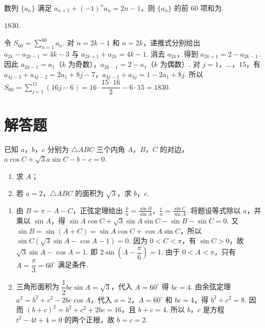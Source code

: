 \begin{problem}
数列 \(\{a_{n}\}\) 满足 \(a_{n + 1} + (-1)^n a_n = 2n - 1\)，则 \(\{a_n\}\) 的前 \(60\) 项和为\fillinblank{}.
\end{problem}

\begin{answer}
\(1830\).
\end{answer}

\begin{solution}
令 \(S_{60}=\sum_{n=1}^{60}a_n\). 对 \(n=2k-1\) 和 \(n=2k\)，递推式分别给出 \(a_{2k}-a_{2k-1}=4k-3\) 与 \(a_{2k+1}+a_{2k}=4k-1\). 消去 \(a_{2k}\)，得到 \(a_{2k+1}=2-a_{2k-1}\). 因此 \(a_{2k-1}=a_1\)（\(k\) 为奇数），\(a_{2k-1}=2-a_1\)（\(k\) 为偶数）. 对 \(j=1\)，\(\dots\)，\(15\)，有
\(a_{4j-3}+a_{4j-2}=2a_1+8j-7\)，\(a_{4j-1}+a_{4j}=1-2a_1+8j\). 所以 \(S_{60}=\sum_{j=1}^{15}(16j-6)=16\cdot\dfrac{15\cdot16}{2}-6\cdot15=1830\).
\end{solution}

\section{解答题}

\begin{problem}
已知 \(a\)，\(b\)，\(c\) 分别为 \(\triangle ABC\) 三个内角 \(A\)，\(B\)，\(C\) 的对边，\(a \cos C + \sqrt{3} a \sin C - b - c = 0\).

\begin{enumerate}
\item 求 \(A\)；
\item 若 \(a = 2\)，\(\triangle ABC\) 的面积为 \(\sqrt{3}\)，求 \(b\)，\(c\).
\end{enumerate}
\end{problem}

\begin{solution}
\begin{enumerate}
\item 由 \(B=\pi-A-C\)，正弦定理给出 \(\frac{b}{a}=\frac{\sin B}{\sin A}\)，\(\frac{c}{a}=\frac{\sin C}{\sin A}\). 将题设等式除以 \(a\)，并乘以 \(\sin A\)，得 \(\sin A\cos C+\sqrt3\sin A\sin C-\sin B-\sin C=0\). 又 \(\sin B=\sin(A+C)=\sin A\cos C+\cos A\sin C\)，所以 \(\sin C(\sqrt3\sin A-\cos A-1)=0\). 因为 \(0<C<\pi\)，有 \(\sin C>0\)，故 \(\sqrt3\sin A-\cos A=1\). 即 \(2\sin\left(A-\dfrac\pi6\right)=1\). 由于 \(0<A<\pi\)，只有 \(A=\dfrac\pi3=60^\circ\) 满足条件.
\item 三角形面积为 \(\dfrac12bc\sin A=\sqrt3\)，代入 \(A=60^\circ\) 得 \(bc=4\). 由余弦定理 \(a^2=b^2+c^2-2bc\cos A\)，代入 \(a=2\)，\(A=60^\circ\) 和 \(bc=4\)，得 \(b^2+c^2=8\). 因而 \((b+c)^2=b^2+c^2+2bc=16\)，且 \(b+c=4\). 所以 \(b\)，\(c\) 是方程 \(t^2-4t+4=0\) 的两个正根，故 \(b=c=2\).
\end{enumerate}
\end{solution}

